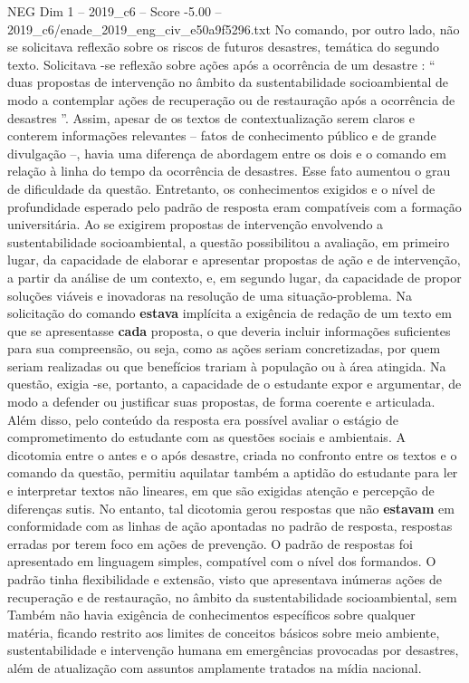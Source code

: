 \begin{textsample}{NEG Dim 1 – 2019\_c6 – Score -5.00 – 2019\_c6/enade\_2019\_eng\_civ\_e50a9f5296.txt}
No comando, por outro lado, não se solicitava reflexão sobre os riscos de futuros desastres, temática do segundo texto.
Solicitava -se reflexão sobre ações após a ocorrência de um desastre : “ duas propostas de intervenção no âmbito da sustentabilidade socioambiental de modo a contemplar ações de recuperação ou de restauração após a ocorrência de desastres ”.
Assim, apesar de os textos de contextualização serem claros e conterem informações relevantes – fatos de conhecimento público e de grande divulgação –, havia uma diferença de abordagem entre os dois e o comando em relação à linha do tempo da ocorrência de desastres.
Esse fato aumentou o grau de dificuldade da questão.
Entretanto, os conhecimentos exigidos e o nível de profundidade esperado pelo padrão de resposta eram compatíveis com a formação universitária.
Ao se exigirem propostas de intervenção envolvendo a sustentabilidade socioambiental, a questão possibilitou a avaliação, em primeiro lugar, da capacidade de elaborar e apresentar propostas de ação e de intervenção, a partir da análise de um contexto, e, em segundo lugar, da capacidade de propor soluções viáveis e inovadoras na resolução de uma situação-problema.
Na solicitação do comando \textbf{estava} implícita a exigência de redação de um texto em que se apresentasse \textbf{cada} proposta, o que deveria incluir informações suficientes para sua compreensão, ou seja, como as ações seriam concretizadas, por quem seriam realizadas ou que benefícios trariam à população ou à área atingida.
Na questão, exigia -se, portanto, a capacidade de o estudante expor e argumentar, de modo a defender ou justificar suas propostas, de forma coerente e articulada.
Além disso, pelo conteúdo da resposta era possível avaliar o estágio de comprometimento do estudante com as questões sociais e ambientais.
A dicotomia entre o antes e o após desastre, criada no confronto entre os textos e o comando da questão, permitiu aquilatar também a aptidão do estudante para ler e interpretar textos não lineares, em que são exigidas atenção e percepção de diferenças sutis.
No entanto, tal dicotomia gerou respostas que não \textbf{estavam} em conformidade com as linhas de ação apontadas no padrão de resposta, respostas erradas por terem foco em ações de prevenção.
O padrão de respostas foi apresentado em linguagem simples, compatível com o nível dos formandos.
O padrão tinha flexibilidade e extensão, visto que apresentava inúmeras ações de recuperação e de restauração, no âmbito da sustentabilidade socioambiental, sem Também não havia exigência de conhecimentos específicos sobre qualquer matéria, ficando restrito aos limites de conceitos básicos sobre meio ambiente, sustentabilidade e intervenção humana em emergências provocadas por desastres, além de atualização com assuntos amplamente tratados na mídia nacional.

\end{textsample}

